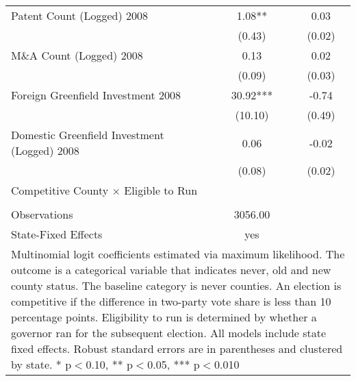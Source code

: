 \begin{table}[!htbp]
\begin{tabular}{l*{2}{c}}
Patent Count (Logged) 2008&        1.08** &        0.03   \\
                    &      (0.43)   &      (0.02)   \\
M\&A Count (Logged) 2008&        0.13   &        0.02   \\
                    &      (0.09)   &      (0.03)   \\
Foreign Greenfield Investment 2008&       30.92***&       -0.74   \\
                    &     (10.10)   &      (0.49)   \\
Domestic Greenfield Investment (Logged) 2008&        0.06   &       -0.02   \\
                    &      (0.08)   &      (0.02)   \\
Competitive County $\times$ Eligible to Run&               &               \\
                    &               &               \\
\hline
Observations        &     3056.00   &               \\
State-Fixed Effects &         yes   &               \\
\hline\hline
\multicolumn{3}{p{\linewidth}}{\footnotesize Multinomial logit coefficients estimated via maximum likelihood. The outcome is a categorical variable that indicates  never, old and new county status. The baseline category is never counties. An election is competitive if the difference in two-party vote share is less than 10 percentage points. Eligibility to run is determined by whether a governor ran for the subsequent election. All models include state fixed effects. Robust standard errors are in parentheses and clustered by state. * p$<$0.10, ** p$<$0.05, *** p$<$0.010}\\
\end{tabular}
\end{table}
